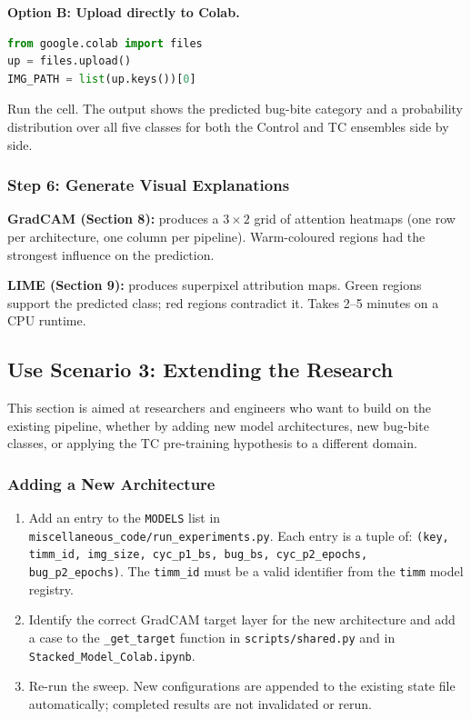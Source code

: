 \documentclass[12pt,a4paper]{article}
\begin{document}
\textbf{Option B: Upload directly to Colab.}
\begin{lstlisting}[language=Python]
from google.colab import files
up = files.upload()
IMG_PATH = list(up.keys())[0]
\end{lstlisting}

Run the cell. The output shows the predicted bug-bite category and
a probability distribution over all five classes for both the Control
and TC ensembles side by side.

\subsubsection{Step 6: Generate Visual Explanations}

\textbf{GradCAM (Section 8):} produces a $3 \times 2$ grid of attention
heatmaps (one row per architecture, one column per pipeline). Warm-coloured
regions had the strongest influence on the prediction.

\textbf{LIME (Section 9):} produces superpixel attribution maps. Green
regions support the predicted class; red regions contradict it. Takes
2--5 minutes on a CPU runtime.

\subsection{Use Scenario 3: Extending the Research}
\label{sec:ug-extend}

This section is aimed at researchers and engineers who want to build on
the existing pipeline, whether by adding new model architectures, new
bug-bite classes, or applying the TC pre-training hypothesis to a
different domain.

\subsubsection{Adding a New Architecture}

\begin{enumerate}
    \item Add an entry to the \texttt{MODELS} list in
          \texttt{miscellaneous\_code/run\_experiments.py}. Each entry is
          a tuple of:
          \texttt{(key, timm\_id, img\_size, cyc\_p1\_bs, bug\_bs,
          cyc\_p2\_epochs, bug\_p2\_epochs)}.
          The \texttt{timm\_id} must be a valid identifier from the
          \texttt{timm} model registry.
    \item Identify the correct GradCAM target layer for the new
          architecture and add a case to the \texttt{\_get\_target}
          function in \texttt{scripts/shared.py} and in
          \texttt{Stacked\_Model\_Colab.ipynb}.
    \item Re-run the sweep. New configurations are appended to the
          existing state file automatically; completed results are not
          invalidated or rerun.
\end{enumerate}
\end{document}
